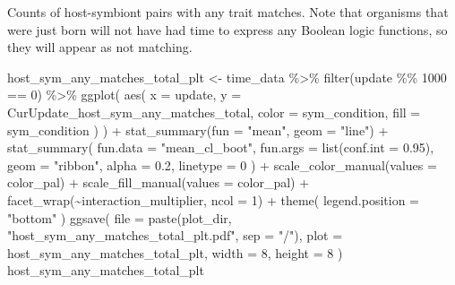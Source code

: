 \documentclass[
]{book}
\newenvironment{Shaded}{\begin{snugshade}}{\end{snugshade}}
\newcommand{\AttributeTok}[1]{\textcolor[rgb]{0.77,0.63,0.00}{#1}}
\newcommand{\DecValTok}[1]{\textcolor[rgb]{0.00,0.00,0.81}{#1}}
\newcommand{\FloatTok}[1]{\textcolor[rgb]{0.00,0.00,0.81}{#1}}
\newcommand{\FunctionTok}[1]{\textcolor[rgb]{0.00,0.00,0.00}{#1}}
\newcommand{\NormalTok}[1]{#1}
\newcommand{\OtherTok}[1]{\textcolor[rgb]{0.56,0.35,0.01}{#1}}
\newcommand{\SpecialCharTok}[1]{\textcolor[rgb]{0.00,0.00,0.00}{#1}}
\newcommand{\StringTok}[1]{\textcolor[rgb]{0.31,0.60,0.02}{#1}}
\begin{document}
Counts of host-symbiont pairs with any trait matches.
Note that organisms that were just born will not have had time to express any
Boolean logic functions, so they will appear as not matching.

\begin{Shaded}
\begin{Highlighting}[]
\NormalTok{host\_sym\_any\_matches\_total\_plt }\OtherTok{\textless{}{-}}\NormalTok{ time\_data }\SpecialCharTok{\%\textgreater{}\%}
  \FunctionTok{filter}\NormalTok{(update }\SpecialCharTok{\%\%} \DecValTok{1000} \SpecialCharTok{==} \DecValTok{0}\NormalTok{) }\SpecialCharTok{\%\textgreater{}\%}
  \FunctionTok{ggplot}\NormalTok{(}
    \FunctionTok{aes}\NormalTok{(}
      \AttributeTok{x =}\NormalTok{ update,}
      \AttributeTok{y =}\NormalTok{ CurUpdate\_host\_sym\_any\_matches\_total,}
      \AttributeTok{color =}\NormalTok{ sym\_condition,}
      \AttributeTok{fill =}\NormalTok{ sym\_condition}
\NormalTok{    )}
\NormalTok{  ) }\SpecialCharTok{+}
  \FunctionTok{stat\_summary}\NormalTok{(}\AttributeTok{fun =} \StringTok{"mean"}\NormalTok{, }\AttributeTok{geom =} \StringTok{"line"}\NormalTok{) }\SpecialCharTok{+}
  \FunctionTok{stat\_summary}\NormalTok{(}
    \AttributeTok{fun.data =} \StringTok{"mean\_cl\_boot"}\NormalTok{,}
    \AttributeTok{fun.args =} \FunctionTok{list}\NormalTok{(}\AttributeTok{conf.int =} \FloatTok{0.95}\NormalTok{),}
    \AttributeTok{geom =} \StringTok{"ribbon"}\NormalTok{,}
    \AttributeTok{alpha =} \FloatTok{0.2}\NormalTok{,}
    \AttributeTok{linetype =} \DecValTok{0}
\NormalTok{  ) }\SpecialCharTok{+}
  \FunctionTok{scale\_color\_manual}\NormalTok{(}\AttributeTok{values =}\NormalTok{ color\_pal) }\SpecialCharTok{+}
  \FunctionTok{scale\_fill\_manual}\NormalTok{(}\AttributeTok{values =}\NormalTok{ color\_pal) }\SpecialCharTok{+}
  \FunctionTok{facet\_wrap}\NormalTok{(}\SpecialCharTok{\textasciitilde{}}\NormalTok{interaction\_multiplier, }\AttributeTok{ncol =} \DecValTok{1}\NormalTok{) }\SpecialCharTok{+}
  \FunctionTok{theme}\NormalTok{(}
    \AttributeTok{legend.position =} \StringTok{"bottom"}
\NormalTok{  )}
\FunctionTok{ggsave}\NormalTok{(}
  \AttributeTok{file =} \FunctionTok{paste}\NormalTok{(plot\_dir, }\StringTok{"host\_sym\_any\_matches\_total\_plt.pdf"}\NormalTok{, }\AttributeTok{sep =} \StringTok{"/"}\NormalTok{),}
  \AttributeTok{plot =}\NormalTok{ host\_sym\_any\_matches\_total\_plt,}
  \AttributeTok{width =} \DecValTok{8}\NormalTok{,}
  \AttributeTok{height =} \DecValTok{8}
\NormalTok{)}
\NormalTok{host\_sym\_any\_matches\_total\_plt}
\end{Highlighting}
\end{Shaded}
\end{document}
